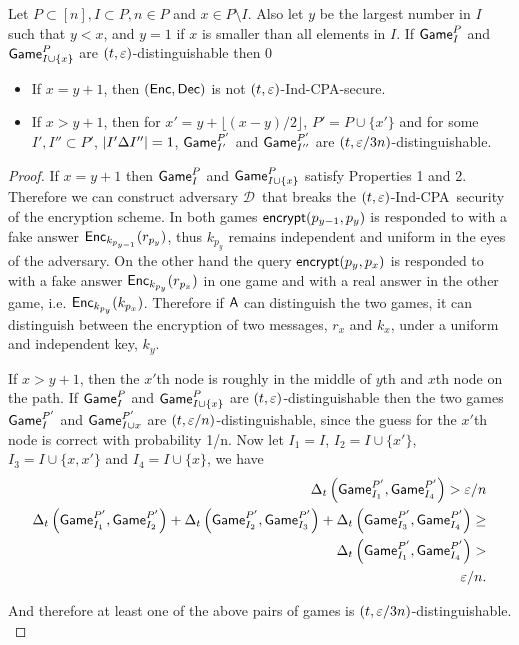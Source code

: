 \documentclass{article}
\newcommand{\tcpa}{$(t,\eps)$-Ind-CPA}
\def\A{{\sf A}}
\def\a {${\mathcal D}$}
\newcommand{\encrypt}{{\sf encrypt}}
\newcommand{\game}{{\sf Game}}
\newcommand{\dgg}[2]{\game_{#1}^{#2}}
\def\newver{1}
\begin{document}
\begin{lemma}\label{lem:single}
Let $P\subset [n], I \subset P, n\in P$ and $x\in P\setminus I$. Also let $y$ be the largest number in $I$ such that $y < x$, and $y=1$ if  $x$ is smaller than all elements in $I$. If $\dgg{I}{P}$ and $\dgg{I\cup \{x\}}{P}$ are $(t,\varepsilon)$-distinguishable then 
\if\newver0
\begin{itemize}
\item If $x=y+1$, then $({\sf Enc},{\sf Dec})$ is not \tcpa-secure.
\item If $x>y+1$, then for $x'=y+\lfloor{(x-y)/2}\rfloor$, $P'=P\cup \{x'\}$ and for some $I', I'' \subset P'$, $\left| I'\Delta I'' \right| =1$, $\dgg{I'}{P'}$ and $\dgg{I''}{P'}$ are $(t, \varepsilon/3n)$-distinguishable.
\end{itemize}
\end{lemma}

\begin{proof}
If $x=y+1$ then $\dgg{I}{P}$ and $\dgg{I\cup \{x\}}{P}$ satisfy Properties 1 and 2. Therefore we can construct adversary \a~that breaks  the \tcpa~security of the encryption scheme. In both games $\encrypt(p_{y-1},p_{y})$ is responded to with a fake answer ${\sf Enc}_{k_{p_{y-1}}}(r_{p_{y}})$, thus $k_{p_{y}} $ remains independent and uniform in the eyes of the adversary. On the other hand the query $\encrypt(p_{y},p_x)$ is responded to with a fake answer ${\sf Enc}_{k_{p_{y}}}(r_{p_{x}})$ in one game and with a real answer in the other game, i.e. ${\sf Enc}_{k_{p_{y}}}(k_{p_{x}})$. Therefore if $\A$ can distinguish the two games, it can distinguish between the encryption of two messages, $r_x$ and $k_x$, under a uniform and independent key, $k_y$. 

If $x>y+1$, then the $x'$th node is roughly in the middle of $y$th and $x$th node on the path. If $\dgg{I}{P}$ and $\dgg{I\cup \{x\}}{P}$ are $(t,\varepsilon)$-distinguishable then the two games  $\dgg{I}{P'}$ and $\dgg{I\cup {x}}{P'}$ are $(t,\varepsilon/n)$-distinguishable, since the guess for the $x'$th node is correct with probability 1/n.
Now let $I_1=I$, $I_2=I\cup \{x'\}$, $I_3=I\cup \{x,x'\}$ and $I_4=I\cup \{x\}$, we have
\begin{align}
\dElta{\dgg{I_1}{P'}, \dgg{I_4}{P'}}  > \eps/n \\
\dElta{\dgg{I_1}{P'}, \dgg{I_2}{P'}} + \dElta{\dgg{I_2}{P'}, \dgg{I_3}{P'}} + \dElta{\dgg{I_3}{P'}, \dgg{I_4}{P'}}  \geq \nonumber\\ \dElta{\dgg{I_1}{P'}, \dgg{I_4}{P'}}  > \nonumber \\ \eps/n.
\end{align}

And therefore at least one of the above pairs of games is $(t,\varepsilon/3n)$-distinguishable. \\
\end{proof}
\end{document}

